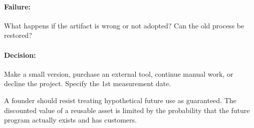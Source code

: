\paragraph*{Failure:} What happens if the artifact is wrong or not adopted? Can the old process be restored?

\paragraph*{Decision:} Make a small version, purchase an external tool, continue manual work, or decline the project. Specify the 1st measurement date.

A founder should resist treating hypothetical future use as guaranteed. The discounted value of a reusable asset is limited by the probability that the future program actually exists and has customers.
